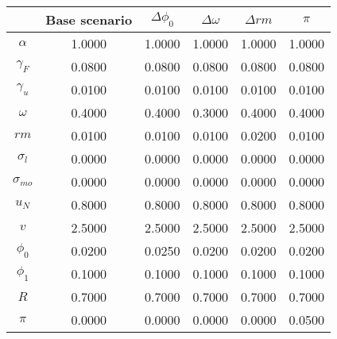 \begin{tabular}{cccccc}
\toprule
{} &  Base scenario &  $\Delta \phi_0$ &  $\Delta \omega$ &  $\Delta rm$ &  $\pi$ \\
\midrule
\textbf{$\alpha$     } &         1.0000 &           1.0000 &           1.0000 &       1.0000 & 1.0000 \\
\textbf{$\gamma_F$   } &         0.0800 &           0.0800 &           0.0800 &       0.0800 & 0.0800 \\
\textbf{$\gamma_u$   } &         0.0100 &           0.0100 &           0.0100 &       0.0100 & 0.0100 \\
\textbf{$\omega$     } &         0.4000 &           0.4000 &           0.3000 &       0.4000 & 0.4000 \\
\textbf{$rm$         } &         0.0100 &           0.0100 &           0.0100 &       0.0200 & 0.0100 \\
\textbf{$\sigma_{l}$ } &         0.0000 &           0.0000 &           0.0000 &       0.0000 & 0.0000 \\
\textbf{$\sigma_{mo}$} &         0.0000 &           0.0000 &           0.0000 &       0.0000 & 0.0000 \\
\textbf{$u_N$        } &         0.8000 &           0.8000 &           0.8000 &       0.8000 & 0.8000 \\
\textbf{$v$          } &         2.5000 &           2.5000 &           2.5000 &       2.5000 & 2.5000 \\
\textbf{$\phi_0$     } &         0.0200 &           0.0250 &           0.0200 &       0.0200 & 0.0200 \\
\textbf{$\phi_1$     } &         0.1000 &           0.1000 &           0.1000 &       0.1000 & 0.1000 \\
\textbf{$R$          } &         0.7000 &           0.7000 &           0.7000 &       0.7000 & 0.7000 \\
\textbf{$\pi$        } &         0.0000 &           0.0000 &           0.0000 &       0.0000 & 0.0500 \\
\bottomrule
\end{tabular}

